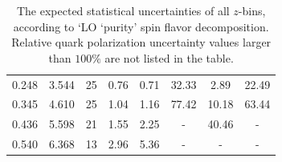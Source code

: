 \begin{table}[htbp]
\begin{center}
\begin{tabular}{|ccc||ccccc|}
   0.248 &   3.544 & 25&        0.76 &         0.71 &        32.33 &         2.89 &        22.49 \\
   0.345 &   4.610 & 25&        1.04 &         1.16 &        77.42 &        10.18 &        63.44 \\
   0.436 &   5.598 & 21&        1.55 &         2.25 &            - &        40.46 &            - \\
   0.540 &   6.368 & 13&        2.96 &         5.36 &            - &            - &            - \\
 \hline
\end{tabular}
\end{center}
\caption{\label{tab:purityallz}  The expected statistical uncertainties of  all $z$-bins,  according to  `LO `purity' spin flavor decomposition.  Relative quark polarization  uncertainty values larger than $100 \%$ are not listed in the table.
}
\end{table}


